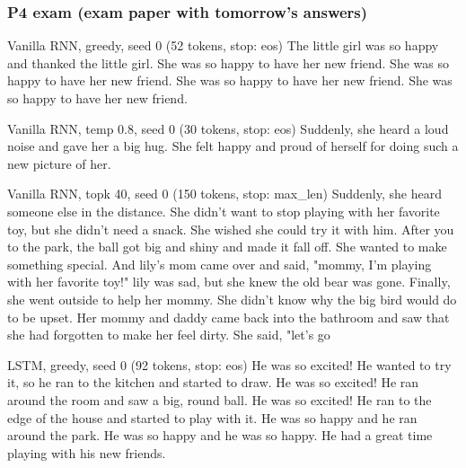 \subsubsection*{P4 exam (exam paper with tomorrow's answers)}

\begin{modelout}{Vanilla RNN, greedy, seed 0 (52 tokens, stop: eos)}
\small The little girl was so happy and thanked the little girl. She was so happy to have her new friend. She was so happy to have her new friend. She was so happy to have her new friend. She was so happy to have her new friend.
\end{modelout}

\begin{modelout}{Vanilla RNN, temp 0.8, seed 0 (30 tokens, stop: eos)}
\small Suddenly, she heard a loud noise and gave her a big hug. She felt happy and proud of herself for doing such a new picture of her.
\end{modelout}

\begin{modelout}{Vanilla RNN, topk 40, seed 0 (150 tokens, stop: max\_len)}
\small Suddenly, she heard someone else in the distance. She didn't want to stop playing with her favorite toy, but she didn't need a snack. She wished she could try it with him. After you to the park, the ball got big and shiny and made it fall off. She wanted to make something special. And lily's mom came over and said, "mommy, I'm playing with her favorite toy!" lily was sad, but she knew the old bear was gone. Finally, she went outside to help her mommy. She didn't know why the big bird would do to be upset. Her mommy and daddy came back into the bathroom and saw that she had forgotten to make her feel dirty. She said, "let's go
\end{modelout}

\begin{modelout}{LSTM, greedy, seed 0 (92 tokens, stop: eos)}
\small He was so excited! He wanted to try it, so he ran to the kitchen and started to draw. He was so excited! He ran around the room and saw a big, round ball. He was so excited! He ran to the edge of the house and started to play with it. He was so happy and he ran around the park. He was so happy and he was so happy. He had a great time playing with his new friends.
\end{modelout}

